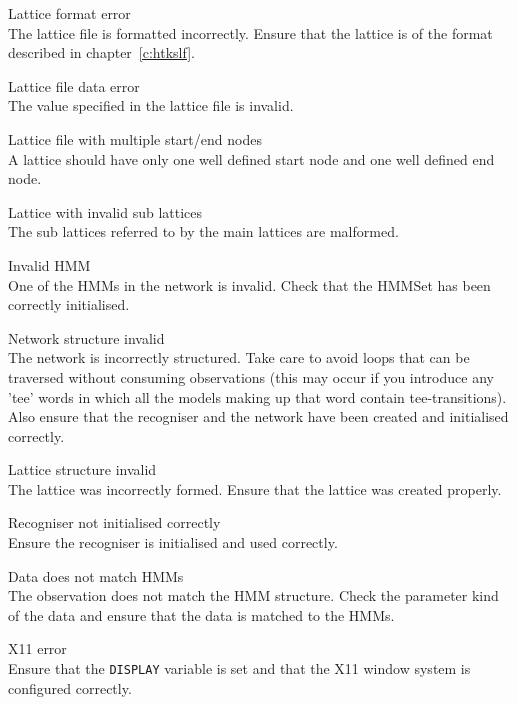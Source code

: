 \begin{itemize}
\begin{itemize}
    Lattice format error\\
        The lattice file is formatted incorrectly.  Ensure that the lattice
        is of the format described in chapter~\ref{c:htkslf}.

    Lattice file data error\\
        The value specified in the lattice file is invalid.

    Lattice file with multiple start/end nodes\\
        A lattice should have only one well defined start node and one
        well defined end node.

    Lattice with invalid sub lattices\\
        The sub lattices referred to by the main lattices are
        malformed.

\end{itemize}


\begin{itemize}
 Invalid HMM\\
        One of the HMMs in the network is invalid.  Check that the HMMSet
        has been correctly initialised.

    Network structure invalid\\
        The network is incorrectly structured.  Take care to avoid loops
        that can be traversed without consuming observations (this may occur 
        if you introduce any 'tee' words in which all the models making up that
        word contain tee-transitions).  Also ensure that the recogniser and
        the network have been created and initialised correctly.

    Lattice structure invalid\\
        The lattice was incorrectly formed.  Ensure that the lattice was
        created properly.

 Recogniser not initialised correctly\\
        Ensure the recogniser is initialised and used correctly.

    Data does not match HMMs\\
        The observation does not match the HMM structure.  Check the parameter
        kind of the data and ensure that the data is matched to the HMMs.

\end{itemize}


\begin{itemize}
    X11 error\\
        Ensure that the \texttt{DISPLAY} variable is set and that the
        X11 window system is configured correctly.

\end{itemize}

\end{itemize}


